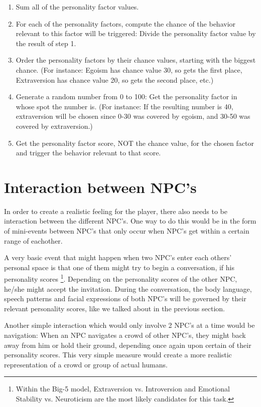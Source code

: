 \documentclass{article}
\begin{document}
    \begin{enumerate}
    	\item Sum all of the personality factor values. 
    	\item For each of the personality factors, compute the chance of the behavior relevant to this factor will be triggered: Divide the personality factor value by the result of step 1.
    	\item Order the personality factors by their chance values, starting with the biggest chance. (For instance: Egoism has chance value 30, so gets the first place, Extraversion has chance value 20, so gets the second place, etc.)
    	\item Generate a random number from 0 to 100: Get the personality factor in whose spot the number is. (For instance: If the resulting number is 40, extraversion will be chosen since 0-30 was covered by egoism, and 30-50 was covered by extraversion.)
    	\item Get the personality factor score, NOT the chance value, for the chosen factor and trigger the behavior relevant to that score.
    \end{enumerate}


	\newpage
	\section{Interaction between NPC's}
	In order to create a realistic feeling for the player, there also needs to be interaction between the different NPC's. One way to do this would be in the form of mini-events between NPC's that only occur when NPC's get within a certain range of eachother. 

	A very basic event that might happen when two NPC's enter each others' personal space is that one of them might try to begin a conversation, if his personality scores \footnote{Within the Big-5 model, Extraversion vs. Introversion and Emotional Stability vs. Neuroticism are the most likely candidates for this task.}. Depending on the personality scores of the other NPC, he/she might accept the invitation. During the conversation, the body language, speech patterns and facial expressions of both NPC's will be governed by their relevant personality scores, like we talked about in the previous section.

	Another simple interaction which would only involve 2 NPC's at a time would be navigation: When an NPC navigates a crowd of other NPC's, they might back away from him or hold their ground, depending once again upon certain of their personality scores. This very simple measure would create a more realistic representation of a crowd or group of actual humans.
\end{document}
